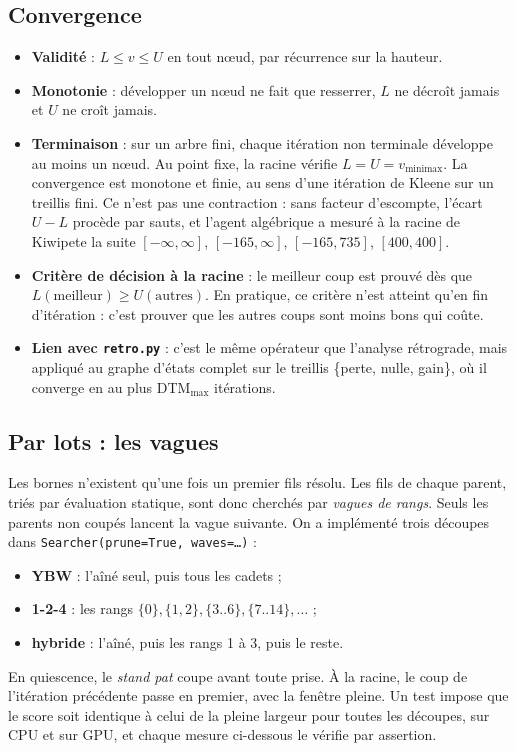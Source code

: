 \documentclass[11pt,a4paper]{article}
\newcommand{\code}[1]{\texttt{#1}}
\begin{document}
\subsection{Convergence}
\begin{itemize}
\item \textbf{Validité} : $L\le v\le U$ en tout nœud, par récurrence sur la hauteur.
\item \textbf{Monotonie} : développer un nœud ne fait que resserrer, $L$ ne décroît jamais et $U$
ne croît jamais.
\item \textbf{Terminaison} : sur un arbre fini, chaque itération non terminale développe au moins
un nœud. Au point fixe, la racine vérifie $L=U=v_{\text{minimax}}$. La convergence est monotone et
finie, au sens d'une itération de Kleene sur un treillis fini. Ce n'est pas une contraction : sans
facteur d'escompte, l'écart $U-L$ procède par sauts, et l'agent algébrique a mesuré à la racine
de Kiwipete la suite $[-\infty,\infty]$, $[-165,\infty]$, $[-165,735]$, $[400,400]$.
\item \textbf{Critère de décision à la racine} : le meilleur coup est prouvé dès que
$L(\text{meilleur})\ge U(\text{autres})$. En pratique, ce critère n'est atteint qu'en fin
d'itération : c'est prouver que les autres coups sont moins bons qui coûte.
\item \textbf{Lien avec \code{retro.py}} : c'est le même opérateur que l'analyse rétrograde, mais
appliqué au graphe d'états complet sur le treillis \{perte, nulle, gain\}, où il converge en au
plus DTM$_{\max}$ itérations.
\end{itemize}

\subsection{Par lots : les vagues}
Les bornes n'existent qu'une fois un premier fils résolu. Les fils de chaque parent, triés par
évaluation statique, sont donc cherchés par \emph{vagues de rangs}. Seuls les parents non coupés
lancent la vague suivante. On a implémenté trois découpes dans \code{Searcher(prune=True,
waves=\ldots)} :
\begin{itemize}
\item \textbf{YBW} : l'aîné seul, puis tous les cadets ;
\item \textbf{1-2-4} : les rangs $\{0\}, \{1,2\}, \{3..6\}, \{7..14\}, \ldots$ ;
\item \textbf{hybride} : l'aîné, puis les rangs 1 à 3, puis le reste.
\end{itemize}
En quiescence, le \emph{stand pat} coupe avant toute prise. À la racine, le coup de l'itération
précédente passe en premier, avec la fenêtre pleine. Un test impose que le score soit identique à
celui de la pleine largeur pour toutes les découpes, sur CPU et sur GPU, et chaque mesure
ci-dessous le vérifie par assertion.
\end{document}
